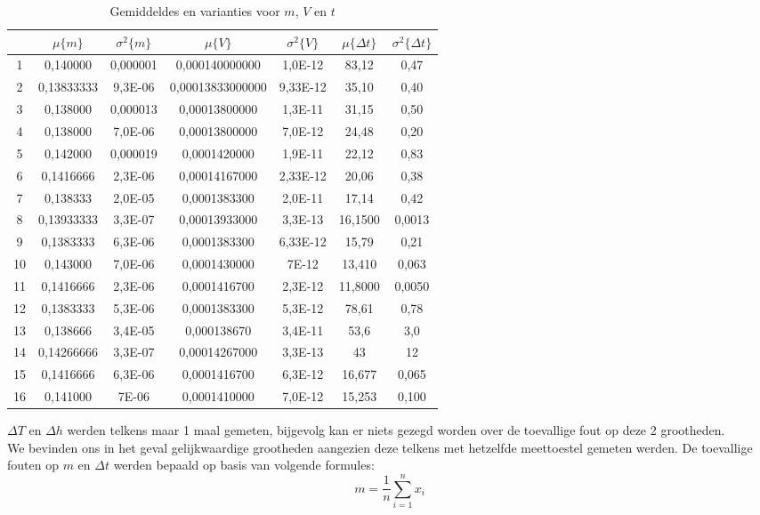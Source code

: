 \begin{table}[h]
    \centering
    \label{tab:mVDt}
    \caption{Gemiddeldes en varianties voor $m$, $V$ en $t$}
    \begin{tabular}{| c | c | c | c | c | c | c |}
        \hline
         & $\mu \{m\}$ & $\sigma ^2 \{m\}$ & $\mu \{V\}$ & $\sigma ^2 \{V\}$ & $\mu \{\Delta t\}$ & $\sigma ^2 \{\Delta t\}$ \\ \hline
        1 & 0,140000 &  0,000001 &   0,000140000000 &    1,0E-12 &  83,12 & 0,47 \\ \hline
        2 & 0,13833333 &    9,3E-06 &0,00013833000000 & 9,33E-12 &   35,10 & 0,40 \\ \hline
        3 & 0,138000 &	0,000013 &	 0,00013800000 &	1,3E-11 &	31,15 &	0,50 \\ \hline
        4 & 0,138000 &	7,0E-06 &	 0,00013800000 &	7,0E-12 &	24,48 &	0,20 \\ \hline
        5 & 0,142000 &	0,000019 &	 0,0001420000 &	1,9E-11 &	22,12 &	0,83 \\ \hline
        6 & 0,1416666 &	2,3E-06 &	 0,00014167000 &	2,33E-12 &	20,06 &	0,38 \\ \hline
        7 & 0,138333 &	2,0E-05 &	 0,0001383300 &	2,0E-11 &	17,14 &	0,42 \\ \hline
        8 & 0,13933333 &	3,3E-07 &0,00013933000 &	3,3E-13 &	16,1500 &	0,0013 \\ \hline
        9 & 0,1383333 &	6,3E-06 &	 0,0001383300 &	6,33E-12 &	15,79 &	0,21 \\ \hline
        10 & 0,143000 &	7,0E-06 &	 0,0001430000 &	7E-12 &	13,410 &	0,063 \\ \hline
        11 & 0,1416666 &	2,3E-06 &0,0001416700 &	2,3E-12 &	11,8000 &	0,0050 \\ \hline
        12 & 0,1383333 &	5,3E-06 &0,0001383300 &	5,3E-12 &	78,61 &	0,78 \\ \hline
        13 & 0,138666 &	3,4E-05 &	 0,000138670 &	3,4E-11 &	53,6 &	3,0 \\ \hline
        14 & 0,14266666 &	3,3E-07 &0,00014267000 &	3,3E-13 &	43 &	12 \\ \hline
        15 & 0,1416666 &	6,3E-06 &0,0001416700 &	6,3E-12 &	16,677 &	0,065 \\ \hline
        16 & 0,141000 &	7E-06       &0,0001410000 &	7,0E-12 &	15,253 &	0,100 \\ \hline
    \end{tabular}
\end{table}

$\Delta T$ en $\Delta h$ werden telkens maar 1 maal gemeten, bijgevolg kan er niets gezegd worden over de toevallige fout op deze 2 grootheden.
\\
We bevinden ons in het geval gelijkwaardige grootheden aangezien deze telkens met hetzelfde meettoestel gemeten werden.
De toevallige fouten op $m$ en $\Delta t$ werden bepaald op basis van volgende formules:
\begin{equation}
    m = \frac{1}{n} \sum\limits_{i=1}^n x_i
\end{equation}

